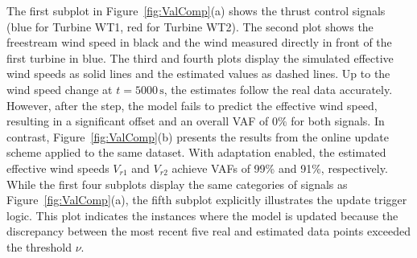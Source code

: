 The first subplot in Figure~\ref{fig:ValComp}(a) shows the thrust control signals (blue for Turbine WT1, red for Turbine WT2). The second plot shows the freestream wind speed in black and the wind measured directly in front of the first turbine in blue. The third and fourth plots display the simulated effective wind speeds as solid lines and the estimated values as dashed lines. Up to the wind speed change at $t = 5000\,\mathrm{s}$, the estimates follow the real data accurately. However, after the step, the model fails to predict the effective wind speed, resulting in a significant offset and an overall VAF of $0\%$ for both signals. In contrast, Figure~\ref{fig:ValComp}(b) presents the results from the online update scheme applied to the same dataset. With adaptation enabled, the estimated effective wind speeds $V_{r1}$ and $V_{r2}$ achieve VAFs of 99\% and 91\%, respectively. While the first four subplots display the same categories of signals as Figure~\ref{fig:ValComp}(a), the fifth subplot explicitly illustrates the update trigger logic. This plot indicates the instances where the model is updated because the discrepancy between the most recent five real and estimated data points exceeded the threshold $\nu$.


